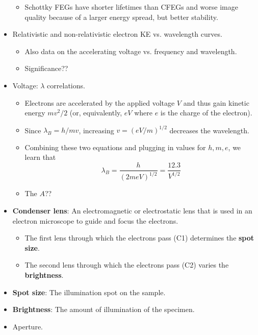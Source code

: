 \documentclass[../notes.tex]{subfiles}
\begin{document}
\begin{itemize}
    \begin{itemize}
        \item Schottky FEGs have shorter lifetimes than CFEGs and worse image quality because of a larger energy spread, but better stability.
    \end{itemize}
    \item Relativistic and non-relativistic electron KE vs. wavelength curves.
    \begin{itemize}
        \item Also data on the accelerating voltage vs. frequency and wavelength.
        \item Significance??
    \end{itemize}
    \item Voltage: $\lambda$ correlations.
    \begin{itemize}
        \item Electrons are accelerated by the applied voltage $V$ and thus gain kinetic energy $mv^2/2$ (or, equivalently, $eV$ where $e$ is the charge of the electron).
        \item Since $\lambda_B=h/mv$, increasing $v=(eV/m)^{1/2}$ decreases the wavelength.
        \item Combining these two equations and plugging in values for $h,m,e$, we learn that
        \begin{equation*}
            \lambda_B = \frac{h}{(2meV)^{1/2}}
            = \frac{12.3}{V^{1/2}}
        \end{equation*}
        \item The $A$??
    \end{itemize}
    \item \textbf{Condenser lens}: An electromagnetic or electrostatic lens that is used in an electron microscope to guide and focus the electrons.
    \begin{itemize}
        \item The first lens through which the electrons pass (C1) determines the \textbf{spot size}.
        \item The second lens through which the electrons pass (C2) varies the \textbf{brightness}.
    \end{itemize}
    \item \textbf{Spot size}: The illumination spot on the sample.
    \item \textbf{Brightness}: The amount of illumination of the specimen.
    \item Aperture.
    \begin{itemize}

\end{itemize}
\end{itemize}
\end{document}
